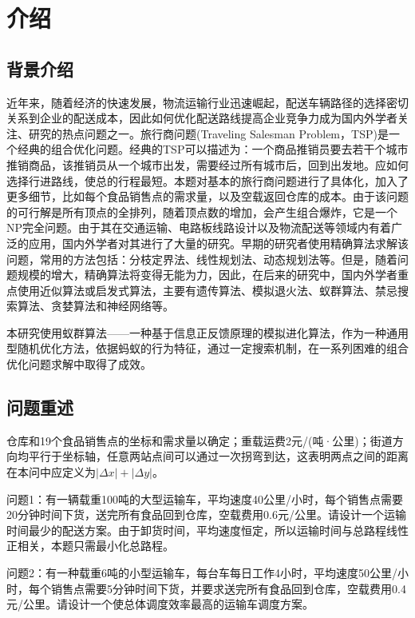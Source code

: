 \documentclass{cumcmthesis}
\begin{document}
\tableofcontents

\newpage

\section{介绍}
	\subsection{背景介绍}
    近年来，随着经济的快速发展，物流运输行业迅速崛起，配送车辆路径的选择密切关系到企业的配送成本，因此如何优化配送路线提高企业竞争力成为国内外学者关注、研究的热点问题之一。旅行商问题(Traveling Salesman Problem，TSP)是一个经典的组合优化问题。经典的TSP可以描述为：一个商品推销员要去若干个城市推销商品，该推销员从一个城市出发，需要经过所有城市后，回到出发地。应如何选择行进路线，使总的行程最短。本题对基本的旅行商问题进行了具体化，加入了更多细节，比如每个食品销售点的需求量，以及空载返回仓库的成本。由于该问题的可行解是所有顶点的全排列，随着顶点数的增加，会产生组合爆炸，它是一个NP完全问题。由于其在交通运输、电路板线路设计以及物流配送等领域内有着广泛的应用，国内外学者对其进行了大量的研究。早期的研究者使用精确算法求解该问题，常用的方法包括：分枝定界法、线性规划法、动态规划法等。但是，随着问题规模的增大，精确算法将变得无能为力，因此，在后来的研究中，国内外学者重点使用近似算法或启发式算法，主要有遗传算法、模拟退火法、蚁群算法、禁忌搜索算法、贪婪算法和神经网络等。

    本研究使用蚁群算法——一种基于信息正反馈原理的模拟进化算法，作为一种通用型随机优化方法，依据蚂蚁的行为特征，通过一定搜索机制，在一系列困难的组合优化问题求解中取得了成效。
    
	\subsection{问题重述}
    仓库和19个食品销售点的坐标和需求量以确定；重载运费2元/(吨·公里)；街道方向均平行于坐标轴，任意两站点间可以通过一次拐弯到达，这表明两点之间的距离在本问中应定义为$|\Delta x|+|\Delta y|$。

    问题1：有一辆载重100吨的大型运输车，平均速度40公里/小时，每个销售点需要20分钟时间下货，送完所有食品回到仓库，空载费用0.6元/公里。请设计一个运输时间最少的配送方案。由于卸货时间，平均速度恒定，所以运输时间与总路程线性正相关，本题只需最小化总路程。

    问题2：有一种载重6吨的小型运输车，每台车每日工作4小时，平均速度50公里/小时，每个销售点需要5分钟时间下货，并要求送完所有食品回到仓库，空载费用0.4元/公里。请设计一个使总体调度效率最高的运输车调度方案。
\end{document}
